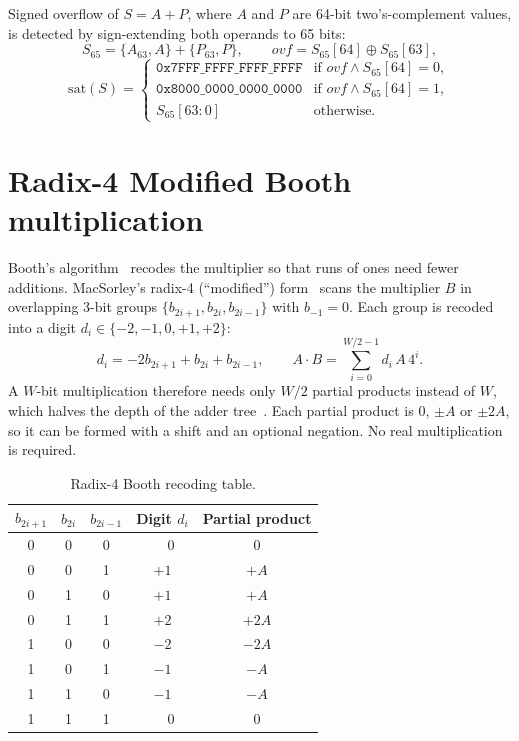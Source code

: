 \documentclass[11pt,a4paper]{report}
\begin{document}
Signed overflow of $S=A+P$, where $A$ and $P$ are 64-bit two's-complement
values, is detected by sign-extending both operands to 65 bits:
\begin{equation}
  S_{65} = \{A_{63},A\} + \{P_{63},P\},\qquad
  \mathit{ovf} = S_{65}[64] \oplus S_{65}[63],
\end{equation}
\begin{equation}
  \mathrm{sat}(S) =
  \begin{cases}
    \mathtt{0x7FFF\_FFFF\_FFFF\_FFFF} & \text{if } \mathit{ovf} \wedge S_{65}[64]=0,\\
    \mathtt{0x8000\_0000\_0000\_0000} & \text{if } \mathit{ovf} \wedge S_{65}[64]=1,\\
    S_{65}[63:0] & \text{otherwise.}
  \end{cases}
\end{equation}

\section{Radix-4 Modified Booth multiplication}
Booth's algorithm~\cite{booth} recodes the multiplier so that runs of ones need
fewer additions. MacSorley's radix-4 (``modified'') form~\cite{macsorley}
scans the multiplier $B$ in overlapping 3-bit groups
$\{b_{2i+1}, b_{2i}, b_{2i-1}\}$ with $b_{-1}=0$. Each group is recoded into a
digit $d_i\in\{-2,-1,0,+1,+2\}$:
\begin{equation}
  d_i = -2b_{2i+1} + b_{2i} + b_{2i-1},\qquad
  A\cdot B = \sum_{i=0}^{W/2-1} d_i\,A\,4^{i}.
\end{equation}
A $W$-bit multiplication therefore needs only $W/2$ partial products instead
of $W$, which halves the depth of the adder tree~\cite{parhami}. Each partial
product is $0$, $\pm A$ or $\pm 2A$, so it can be formed with a shift and
an optional negation. No real multiplication is required.

\begin{table}[H]
  \centering
  \caption{Radix-4 Booth recoding table.}
  \label{tab:booth}
  \begin{tabular}{@{}ccccc@{}}
    \toprule
    $b_{2i+1}$ & $b_{2i}$ & $b_{2i-1}$ & Digit $d_i$ & Partial product \\
    \midrule
    0&0&0& $\phantom{-}0$ & $0$ \\
    0&0&1& $+1$ & $+A$ \\
    0&1&0& $+1$ & $+A$ \\
    0&1&1& $+2$ & $+2A$ \\
    1&0&0& $-2$ & $-2A$ \\
    1&0&1& $-1$ & $-A$ \\
    1&1&0& $-1$ & $-A$ \\
    1&1&1& $\phantom{-}0$ & $0$ \\
    \bottomrule
  \end{tabular}
\end{table}
\end{document}
